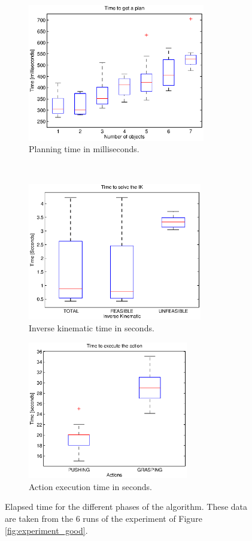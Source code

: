 \begin{figure}[tb]
\begin{subfigure}[t]{0.45\textwidth}
\label{fig:time_predicates}
\end{subfigure}
\begin{subfigure}[t]{0.48\textwidth}
\centering
\includegraphics[height=6.0cm]{Img/experiments/exp_good/data/planning.eps}
\caption{Planning time in milliseconds.}\label{fig:time_plan}
\end{subfigure}
\\
\begin{subfigure}[t]{0.48\textwidth}
\centering
\includegraphics[height=6.0cm]{Img/experiments/exp_good/data/ik.eps}
\caption{Inverse kinematic time in seconds.}
\end{subfigure}
\begin{subfigure}[t]{0.45\textwidth}
\centering
\includegraphics[height=6.0cm]{Img/experiments/exp_good/data/actions.eps}
\caption{Action execution time in seconds.}
\end{subfigure}
\caption{Elapsed time for the different phases of the algorithm. These data are taken from the 6 runs of the experiment of Figure \ref{fig:experiment_good}.}\label{fig:time_results}
\end{figure}
